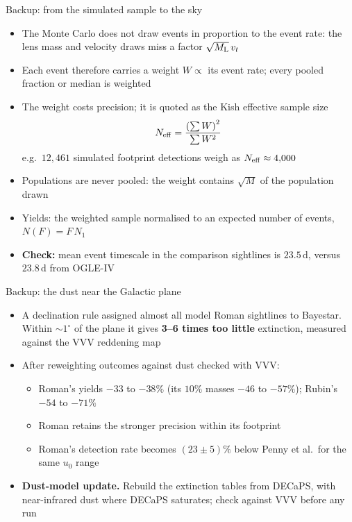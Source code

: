 \begin{frame}{Backup: from the simulated sample to the sky}
\begin{itemize}
  \item The Monte Carlo does not draw events in proportion to the event rate: the lens mass and velocity draws miss a
        factor $\sqrt{M_{\rm L}}\,v_t$
  \item Each event therefore carries a weight $W\propto$ its event rate; every pooled fraction or median is weighted
  \item The weight costs precision; it is quoted as the Kish effective sample size
  \[
    N_{\rm eff} = \frac{\left(\sum W\right)^2}{\sum W^2}
  \]
        e.g.\ $12{,}461$ simulated footprint detections weigh as $N_{\rm eff}\approx4{,}000$
  \item Populations are never pooled: the weight contains $\sqrt{M}$ of the population drawn
  \item Yields: the weighted sample normalised to an expected number of events, $N(F)=F\,N_1$
  \item \textbf{Check:} mean event timescale in the comparison sightlines is $23.5$\,d, versus $23.8$\,d from OGLE-IV
\end{itemize}
\vfill
{}
\end{frame}

\begin{frame}{Backup: the dust near the Galactic plane}
\begin{itemize}
  \item A declination rule assigned almost all model Roman sightlines to Bayestar. Within
        $\sim\!1^\circ$ of the plane it gives \textbf{3--6 times too little} extinction, measured against the VVV
        reddening map
  \item After reweighting outcomes against dust checked with VVV:
  \begin{itemize}
    \item Roman's yields $-33$ to $-38\%$ (its $10\%$ masses $-46$ to $-57\%$); Rubin's $-54$ to $-71\%$
    \item Roman retains the stronger precision within its footprint
    \item Roman's detection rate becomes $(23\pm5)\%$ below Penny et al.\ for the same $u_0$ range
  \end{itemize}
  \item \textbf{Dust-model update.} Rebuild the extinction tables from DECaPS, with near-infrared dust where DECaPS saturates;
        check against VVV before any run
\end{itemize}
\vfill
{}
\end{frame}

